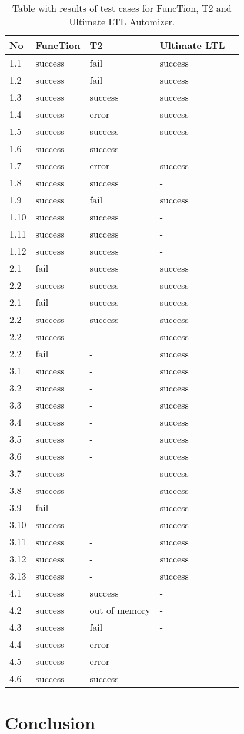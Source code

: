 \documentclass[11pt,a4paper,titlepage]{article}
\theoremstyle{definition}
\begin{document}
\begin{table}
\begin{tabular}{l l l l l}
    \textbf{No} & \textbf{FuncTion} & \textbf{T2} & \textbf{Ultimate LTL}  \\
    \hline
    1.1 & success & fail & success \\
    1.2 & success & fail & success \\
    1.3 & success & success & success \\
    1.4 & success & error & success \\
    1.5 & success & success & success \\
    1.6 & success & success & - \\
    1.7 & success & error & success \\
    1.8 & success & success & - \\
    1.9 & success & fail & success \\
    1.10 & success & success & - \\
    1.11 & success & success & - \\
    1.12 & success & success & - \\
    \hline
    2.1 & fail & success & success \\
    2.2 & success & success & success \\
    2.1 & fail & success & success \\
    2.2 & success & success & success \\
    2.2 & success & - & success \\
    2.2 & fail & - & success \\
    \hline
    3.1 & success & - & success \\
    3.2 & success & - & success \\
    3.3 & success & - & success \\
    3.4 & success & - & success \\
    3.5 & success & - & success \\
    3.6 & success & - & success \\
    3.7 & success & - & success \\
    3.8 & success & - & success \\
    3.9 & fail & - & success \\
    3.10 & success & - & success \\
    3.11 & success & - & success \\
    3.12 & success & - & success \\
    3.13 & success & - & success \\
    \hline
    4.1 & success & success & - \\
    4.2 & success & out of memory & - \\
    4.3 & success & fail & - \\
    4.4 & success & error & - \\
    4.5 & success & error & - \\
    4.6 & success & success & - \\
\end{tabular}
\caption{Table with results of test cases for FuncTion, T2 and Ultimate LTL Automizer.}
\label{tbl:test_cases_results}
\end{table}



\section{Conclusion}

\pagebreak



\end{document}

